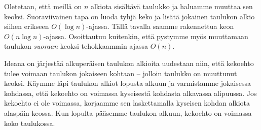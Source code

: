 Oletetaan, että meillä on $n$ alkiota sisältävä taulukko
ja haluamme muuttaa sen keoksi.
Suoraviivainen tapa on luoda tyhjä keko ja
lisätä jokainen taulukon alkio siihen erikseen $O(\log n)$-ajassa.
Tällä tavalla saamme rakennettua keon $O(n \log n)$-ajassa.
Osoittautuu kuitenkin, että pystymme myös muuttamaan taulukon
\emph{suoraan} keoksi tehokkaammin ajassa $O(n)$.

Ideana on järjestää alkuperäisen taulukon alkioita uudestaan niin,
että kekoehto tulee voimaan taulukon jokaiseen kohtaan --
jolloin taulukko on muuttunut keoksi.
Käymme läpi taulukon alkiot lopusta alkuun ja varmistamme
jokaisessa kohdassa, että kekoehto on voimassa kyseisestä
kohdasta alkavassa alipuussa.
Jos kekoehto ei ole voimassa, korjaamme sen laskettamalla
kyseisen kohdan alkiota alaspäin keossa.
Kun lopulta pääsemme taulukon alkuun, kekoehto on voimassa
koko taulukossa.

